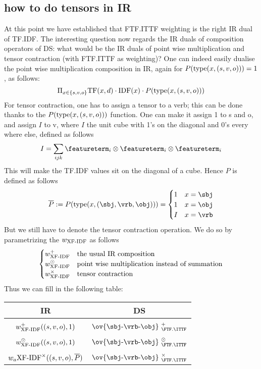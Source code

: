 \subsection{how to do tensors in IR}
At this point we have established that  FTF.ITTF weighting is the right IR dual of TF.IDF. The interesting question now regards the  IR duals of  composition operators of DS:  what would  be the IR duals of point wise multiplication and tensor contraction (with FTF.ITTF as weighting)?  One can indeed easily dualise the point wise multiplication composition in IR, again for $P(\textmd{type}(x,(s,v,o))) = 1$, as follows:
\[
\Pi_{x \in \{s,v,o\}} \textmd{TF}(x,d) \cdot \textmd{IDF}(x) \cdot P(\textmd{type}(x,(s,v,o)))\]
For tensor contraction, one has to assign a tensor to a verb; this can be done thanks to the $P(\textmd{type}(x,(s,v,o)))$  function. One can make it assign  1 to s and o, and assign $I$ to  v, where $I$ the unit cube with 1's on the diagonal and 0's every where else, defined as follows
 \[
 I = \sum_{ijk} \featureterm_i \otimes \featureterm_i \otimes \featureterm_i
 \]
 This will make the TF.IDF values sit on the diagonal of a cube.  Hence $P$ is defined as follows 
\[
\overline{P} := P(\textmd{type}(x,(\sbj,\vrb,\obj))) =  \begin{cases}
1 & x = \sbj \\
1 & x = \obj\\
I & x = \vrb
\end{cases}
\]
But we still have to denote the tensor contraction operation. We do so by parametrizing the $w_\textmd{XF-IDF}$ as follows
\[
\begin{cases}
w_\textmd{XF-IDF}^+ & \mbox{the usual IR composition}\\
w_\textmd{XF-IDF}^{\odot} &   \mbox{point wise multiplication instead of summation}\\
w_\textmd{XF-IDF}^{\times} &   \mbox{tensor contraction}
\end{cases}
\] 
 Thus we can fill in the following table:
 \begin{center}
 \begin{tabular}{c|c}
 IR & DS\\
 \hline
 \hline
 &\\
$w_\textmd{XF-IDF}^+((s,v,o), 1)$ &$ \ov{\sbj\text{-}\vrb\text{-}\obj}\ _{\FTF.\ITTF}^{+}$ \\
&\\
$w_\textmd{XF-IDF}^{\odot}((s,v,o), 1)$ & $ \ov{\sbj\text{-}\vrb\text{-}\obj}\ _{\FTF.\ITTF}^{\odot}$ \\
&\\
$w_a\textmd{XF-IDF}^{\times}((s,v,o), \overline{P})$ & $ \ov{\sbj\text{-}\vrb\text{-}\obj}\ _{\FTF.\ITTF}^{\times}$ 
 \end{tabular}
 \end{center}
 

